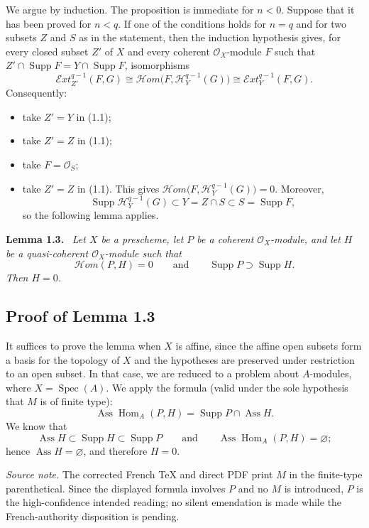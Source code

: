 \documentclass[11pt,a4paper]{article}
\newcommand{\OX}{\mathcal O_X}
\newcommand{\SheafExt}{\mathcal E\!xt}
\newcommand{\SheafHom}{\mathcal H\!om}
\newcommand{\SheafH}{\mathcal H}
\newcommand{\Homop}{\operatorname{Hom}}
\newcommand{\Assop}{\operatorname{Ass}}
\newcommand{\Supp}{\operatorname{Supp}}
\newcommand{\Spec}{\operatorname{Spec}}
\newenvironment{sgastatement}[1]{\par\addvspace{0.8\baselineskip}\noindent\textbf{#1.}\ \itshape}{\par}
\begin{document}
We argue by induction. The proposition is immediate for $n<0$. Suppose that it
has been proved for $n<q$. If one of the conditions holds for $n=q$ and for two
subsets $Z$ and $S$ as in the statement, then the induction hypothesis gives,
for every closed subset $Z'$ of $X$ and every coherent $\OX$-module $F$ such
that $Z'\cap\Supp F=Y\cap\Supp F$, isomorphisms
\begin{equation}\tag{1.1}
  \SheafExt_{Z'}^{q-1}(F,G)
  \cong\SheafHom\bigl(F,\SheafH_Y^{q-1}(G)\bigr)
  \cong\SheafExt_Y^{q-1}(F,G).
\end{equation}
Consequently:
\begin{itemize}
  \item[(i)$\Rightarrow$(iv)] take $Z'=Y$ in (1.1);
  \item[(iv)$\Rightarrow$(iii)] take $Z'=Z$ in (1.1);
  \item[(iii)$\Rightarrow$(ii)] take $F=\mathcal O_S$;
  \item[(ii)$\Rightarrow$(i)] take $Z'=Z$ in (1.1). This gives
  $\SheafHom\bigl(F,\SheafH_Y^{q-1}(G)\bigr)=0$. Moreover,
  \[
    \Supp\SheafH_Y^{q-1}(G)
    \subset Y=Z\cap S\subset S=\Supp F,
  \]
  so the following lemma applies.
\end{itemize}

\begin{sgastatement}{Lemma 1.3}
Let $X$ be a prescheme, let $P$ be a coherent $\OX$-module, and let $H$ be a
quasi-coherent $\OX$-module such that
\[
  \SheafHom(P,H)=0
  \qquad\text{and}\qquad
  \Supp P\supset\Supp H.
\]
Then $H=0$.
\end{sgastatement}

\subsection*{Proof of Lemma 1.3}
It suffices to prove the lemma when $X$ is affine, since the affine open
subsets form a basis for the topology of $X$ and the hypotheses are preserved
under restriction to an open subset. In that case, we are reduced to a problem
about $A$-modules, where $X=\Spec(A)$. We apply the formula (valid under the
sole hypothesis that $M$ is of finite type):
\[
  \Assop\Homop_A(P,H)=\Supp P\cap\Assop H.
\]
We know that
\[
  \Assop H\subset\Supp H\subset\Supp P
  \qquad\text{and}\qquad
  \Assop\Homop_A(P,H)=\varnothing;
\]
hence $\Assop H=\varnothing$, and therefore $H=0$.

\noindent\textit{Source note.} The corrected French TeX and direct PDF print
$M$ in the finite-type parenthetical. Since the displayed formula involves
$P$ and no $M$ is introduced, $P$ is the high-confidence intended reading;
no silent emendation is made while the French-authority disposition is pending.
\end{document}
